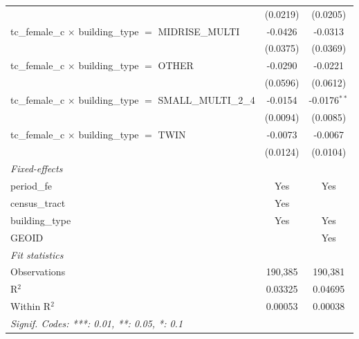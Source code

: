 \begin{tabular}{lcc}
                                                                       & (0.0219)       & (0.0205)\\   
   tc\_female\_c $\times$ building\_type $=$ MIDRISE\_MULTI            & -0.0426        & -0.0313\\   
                                                                       & (0.0375)       & (0.0369)\\   
   tc\_female\_c $\times$ building\_type $=$ OTHER                     & -0.0290        & -0.0221\\   
                                                                       & (0.0596)       & (0.0612)\\   
   tc\_female\_c $\times$ building\_type $=$ SMALL\_MULTI\_2\_4        & -0.0154        & -0.0176$^{**}$\\   
                                                                       & (0.0094)       & (0.0085)\\   
   tc\_female\_c $\times$ building\_type $=$ TWIN                      & -0.0073        & -0.0067\\   
                                                                       & (0.0124)       & (0.0104)\\   
   \midrule
   \emph{Fixed-effects}\\
   period\_fe                                                          & Yes            & Yes\\  
   census\_tract                                                       & Yes            & \\  
   building\_type                                                      & Yes            & Yes\\  
   GEOID                                                               &                & Yes\\  
   \midrule
   \emph{Fit statistics}\\
   Observations                                                        & 190,385        & 190,381\\  
   R$^2$                                                               & 0.03325        & 0.04695\\  
   Within R$^2$                                                        & 0.00053        & 0.00038\\  
   \midrule \midrule
   \multicolumn{3}{l}{\emph{Signif. Codes: ***: 0.01, **: 0.05, *: 0.1}}\\
\end{tabular}
